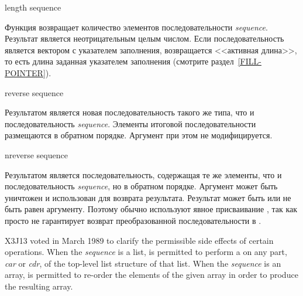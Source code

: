 \begin{defun}[Функция]
length sequence

Функция возвращает количество элементов последовательности
\emph{sequence}. Результат является неотрицательным целым числом.
Если последовательность является вектором с указателем заполнения, возвращается
<<активная длина>>, то есть длина заданная указателем заполнения (смотрите
раздел~\ref{FILL-POINTER}).
\end{defun}

\begin{defun}[Функция]
reverse sequence

Результатом является новая последовательность такого же типа, что и
последовательность \emph{sequence}. Элементы итоговой последовательности
размещаются в обратном порядке.
Аргумент при этом не модифицируется.
\end{defun}

\begin{defun}[Функция]
nreverse sequence

Результатом является последовательность, содержащая те же элементы, что и
последовательность \emph{sequence}, но в обратном порядке. Аргумент может быть
уничтожен и использован для возврата результата. Результат может быть или не
быть равен  аргументу. Поэтому обычно используют явное присваивание
, так как просто  не гарантирует
возврат преобразованной последовательности в .

\begin{newer}
X3J13 voted in March 1989 
to clarify the permissible side effects of certain operations.
When the \emph{sequence} is a list,
 is permitted to perform a  on any part,
\emph{car} or \emph{cdr}, of the top-level list structure of that list.
When the \emph{sequence} is an array,
 is permitted to re-order the elements of the given array
in order to produce the resulting array.
\end{newer}
\end{defun}

